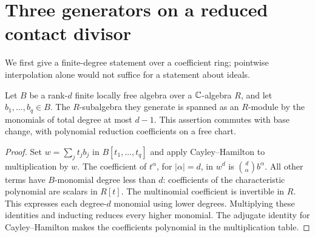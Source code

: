 \section{Three generators on a reduced contact divisor}
\label{sec:three-generators}
We first give a finite-degree statement over a coefficient ring;
pointwise interpolation alone would not suffice for a statement
about ideals.

\begin{lemma}\label{lem:polarized-truncation}
Let $B$ be a rank-$d$ finite locally free algebra over a $\mathbb C$-algebra
$R$, and let $b_1,\ldots,b_q\in B$. The $R$-subalgebra they generate
is spanned as an $R$-module by the monomials of total degree at most
$d-1$. This assertion commutes with base change, with polynomial
reduction coefficients on a free chart.
\end{lemma}
\begin{proof}
Set $w=\sum_j t_jb_j$ in $B[t_1,\ldots,t_q]$ and apply
Cayley--Hamilton to multiplication by $w$. The coefficient of
$t^\alpha$, for $|\alpha|=d$, in $w^d$ is
$\binom d\alpha b^\alpha$. All other terms have $B$-monomial degree
less than $d$: coefficients of the characteristic polynomial are
scalars in $R[t]$. The multinomial coefficient is invertible in $R$.
This expresses each degree-$d$ monomial using lower degrees.
Multiplying these identities and inducting reduces every higher
monomial. The adjugate identity for Cayley--Hamilton makes the
coefficients polynomial in the multiplication table.
\end{proof}

